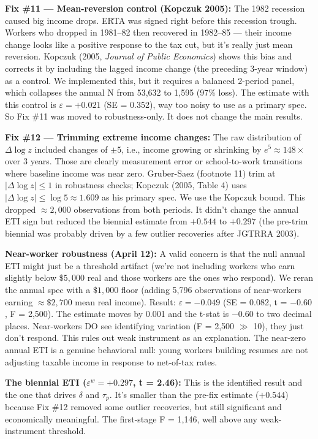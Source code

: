 \documentclass[11pt, letterpaper]{article}
\begin{document}
\textbf{Fix \#11 --- Mean-reversion control (Kopczuk 2005):} The 1982 recession caused big income drops. ERTA was signed right before this recession trough. Workers who dropped in 1981--82 then recovered in 1982--85 --- their income change looks like a positive response to the tax cut, but it's really just mean reversion. Kopczuk (2005, \textit{Journal of Public Economics}) shows this bias and corrects it by including the lagged income change (the preceding 3-year window) as a control. We implemented this, but it requires a balanced 2-period panel, which collapses the annual N from 53,632 to 1,595 (97\% loss). The estimate with this control is $\varepsilon = +0.021$ (SE = 0.352), way too noisy to use as a primary spec. So Fix \#11 was moved to robustness-only. It does not change the main results.

\textbf{Fix \#12 --- Trimming extreme income changes:} The raw distribution of $\Delta \log z$ included changes of $\pm5$, i.e., income growing or shrinking by $e^5 \approx 148\times$ over 3 years. Those are clearly measurement error or school-to-work transitions where baseline income was near zero. Gruber-Saez (footnote 11) trim at $|\Delta \log z| \leq 1$ in robustness checks; Kopczuk (2005, Table 4) uses $|\Delta \log z| \leq \log 5 \approx 1.609$ as his primary spec. We use the Kopczuk bound. This dropped $\approx 2{,}000$ observations from both periods. It didn't change the annual ETI sign but reduced the biennial estimate from $+0.544$ to $+0.297$ (the pre-trim biennial was probably driven by a few outlier recoveries after JGTRRA 2003).

\textbf{Near-worker robustness (April 12):} A valid concern is that the null annual ETI might just be a threshold artifact (we're not including workers who earn slightly below $\$5{,}000$ real and those workers are the ones who respond). We reran the annual spec with a $\$1{,}000$ floor (adding 5,796 observations of near-workers earning $\approx\$2{,}700$ mean real income). Result: $\varepsilon = -0.049$ (SE = 0.082, t = $-0.60$, F = 2,500). The estimate moves by 0.001 and the t-stat is $-0.60$ to two decimal places. Near-workers DO see identifying variation (F = 2,500 $\gg$ 10), they just don't respond. This rules out weak instrument as an explanation. The near-zero annual ETI is a genuine behavioral null: young workers building resumes are not adjusting taxable income in response to net-of-tax rates.

\textbf{The biennial ETI ($\varepsilon^w = +0.297$, t = 2.46):} This is the identified result and the one that drives $\delta$ and $\tau_p$. It's smaller than the pre-fix estimate ($+0.544$) because Fix \#12 removed some outlier recoveries, but still significant and economically meaningful. The first-stage F = 1,146, well above any weak-instrument threshold.
\end{document}
